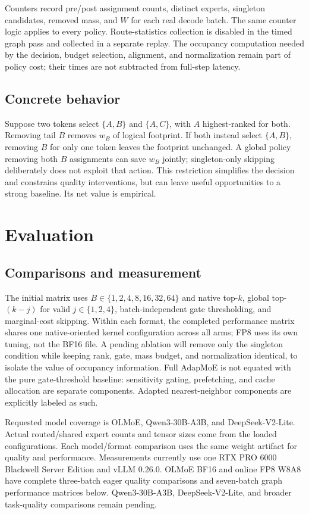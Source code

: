 \documentclass[10pt,twocolumn]{article}
\newcommand{\method}{marginal-cost skipping}
\begin{document}
Counters record pre/post assignment counts, distinct experts, singleton candidates, removed mass, and $W$ for each real decode batch. The same counter logic applies to every policy. Route-statistics collection is disabled in the timed graph pass and collected in a separate replay. The occupancy computation needed by the decision, budget selection, alignment, and normalization remain part of policy cost; their times are not subtracted from full-step latency.

\subsection{Concrete behavior}
Suppose two tokens select $\{A,B\}$ and $\{A,C\}$, with $A$ highest-ranked for both. Removing tail $B$ removes $w_B$ of logical footprint. If both instead select $\{A,B\}$, removing $B$ for only one token leaves the footprint unchanged. A global policy removing both $B$ assignments can save $w_B$ jointly; singleton-only skipping deliberately does not exploit that action. This restriction simplifies the decision and constrains quality interventions, but can leave useful opportunities to a strong baseline. Its net value is empirical.

\section{Evaluation}
\subsection{Comparisons and measurement}
The initial matrix uses $B\in\{1,2,4,8,16,32,64\}$ and native top-$k$, global top-$(k-j)$ for valid $j\in\{1,2,4\}$, batch-independent gate thresholding, and \method. Within each format, the completed performance matrix shares one native-oriented kernel configuration across all arms; FP8 uses its own tuning, not the BF16 file. A pending ablation will remove only the singleton condition while keeping rank, gate, mass budget, and normalization identical, to isolate the value of occupancy information. Full AdapMoE is not equated with the pure gate-threshold baseline: sensitivity gating, prefetching, and cache allocation are separate components. Adapted nearest-neighbor components are explicitly labeled as such.

Requested model coverage is OLMoE, Qwen3-30B-A3B, and DeepSeek-V2-Lite. Actual routed/shared expert counts and tensor sizes come from the loaded configurations. Each model/format comparison uses the same weight artifact for quality and performance. Measurements currently use one RTX PRO 6000 Blackwell Server Edition and vLLM 0.26.0. OLMoE BF16 and online FP8 W8A8 have complete three-batch eager quality comparisons and seven-batch graph performance matrices below. Qwen3-30B-A3B, DeepSeek-V2-Lite, and broader task-quality comparisons remain pending.
\end{document}
